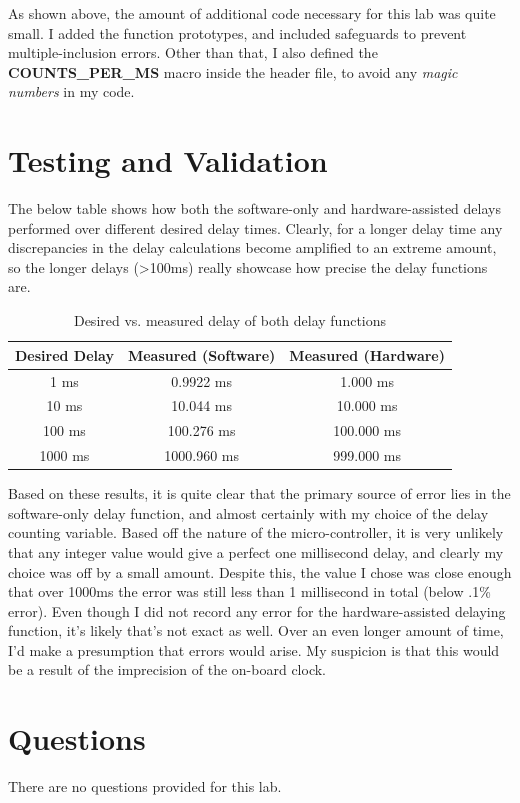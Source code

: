 \documentclass[a4paper, 12pt]{article}
\begin{document}
As shown above, the amount of additional code necessary for this lab was quite small. I added the function prototypes, and included safeguards to prevent multiple-inclusion errors. Other than that, I also defined the \textbf{COUNTS\_PER\_MS} macro inside the header file, to avoid any \textit{magic numbers} in my code.

\section{Testing and Validation}
The below table shows how both the software-only and hardware-assisted delays performed over different desired delay times. Clearly, for a longer delay time any discrepancies in the delay calculations become amplified to an extreme amount, so the longer delays (\textgreater100ms) really showcase how precise the delay functions are.
\begin{table}[!h]
\centering
\begin{tabular}{c|c|c}
\textbf{Desired Delay} & \textbf{Measured (Software)} & \textbf{Measured (Hardware)} \\
\hline
1 ms & 0.9922 ms & 1.000 ms \\
10 ms & 10.044 ms & 10.000 ms \\
100 ms & 100.276 ms & 100.000 ms \\
1000 ms & 1000.960 ms & 999.000 ms \\
\end{tabular}
\caption{Desired vs. measured delay of both delay functions}
\end{table}

Based on these results, it is quite clear that the primary source of error lies in the software-only delay function, and almost certainly with my choice of the delay counting variable. Based off the nature of the micro-controller, it is very unlikely that any integer value would give a perfect one millisecond delay, and clearly my choice was off by a small amount. Despite this, the value I chose was close enough that over 1000ms the error was still less than 1 millisecond in total (below .1\% error). Even though I did not record any error for the hardware-assisted delaying function, it's likely that's not exact as well. Over an even longer amount of time, I'd make a presumption that errors would arise. My suspicion is that this would be a result of the imprecision of the on-board clock.

\section{Questions}
There are no questions provided for this lab.
\end{document}

